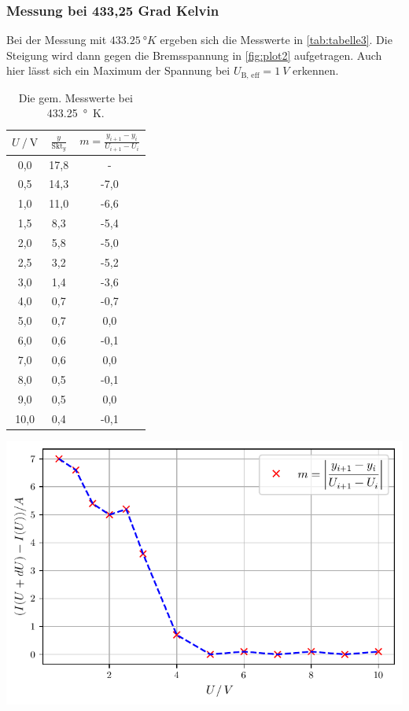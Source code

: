 \subsubsection*{Messung bei 433,25 Grad Kelvin}

Bei der Messung mit $\qty{433.25}{°K}$ ergeben sich die Messwerte in \autoref{tab:tabelle3}.
Die Steigung wird dann gegen die Bremsspannung in \autoref{fig:plot2} aufgetragen.
Auch hier lässt sich ein Maximum der Spannung bei $U_{\text{B, eff}} = \qty{1}{V}$ erkennen.

\begin{table}[H]
  \begin{minipage}[b]{0.4\linewidth}
  \centering
  \begin{tabular}{c c c}
    \toprule
    $U \mathbin{/} \unit\V$ & $\frac{y}{\text{Skt}_y}$ & $m  =\frac{y_{i+1} - y_{i}}{U_{i+1} - U_{i}}$ \\
    \midrule 
     0,0 & 17,8 & -    \\
     0,5 & 14,3 & -7,0 \\
     1,0 & 11,0 & -6,6 \\ 
     1,5 &  8,3 & -5,4 \\ 
     2,0 &  5,8 & -5,0 \\  
     2,5 &  3,2 & -5,2 \\ 
     3,0 &  1,4 & -3,6 \\ 
     4,0 &  0,7 & -0,7 \\
     5,0 &  0,7 &  0,0 \\  
     6,0 &  0,6 & -0,1 \\ 
     7,0 &  0,6 &  0,0 \\ 
     8,0 &  0,5 & -0,1 \\ 
     9,0 &  0,5 &  0,0 \\ 
    10,0 &  0,4 & -0,1 \\
    \bottomrule
  \end{tabular}
  
  \caption{Die gem. Messwerte bei \qty{433,25}{°K}.}
  \label{tab:tabelle3}

  \end{minipage}\hfill
  \begin{minipage}[b]{0.45\linewidth}
  \centering
  \includegraphics[width=\linewidth]{build/plot2.pdf}
  \label{fig:plot2}
  \end{minipage}
\end{table}



